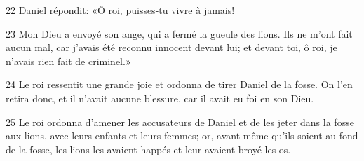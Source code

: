 
22 Daniel répondit: «Ô roi, puisses-tu vivre à jamais!

23 Mon Dieu a envoyé son ange, qui a fermé la gueule des lions. Ils ne m’ont fait aucun mal, car j’avais été reconnu innocent devant lui; et devant toi, ô roi, je n’avais rien fait de criminel.»

24 Le roi ressentit une grande joie et ordonna de tirer Daniel de la fosse. On l’en retira donc, et il n’avait aucune blessure, car il avait eu foi en son Dieu.

25 Le roi ordonna d’amener les accusateurs de Daniel et de les jeter dans la fosse aux lions, avec leurs enfants et leurs femmes; or, avant même qu’ils soient au fond de la fosse, les lions les avaient happés et leur avaient broyé les os.